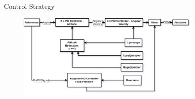 \begin{frame}{Control Strategy}
    \begin{figure}
        \centering
        \includegraphics[width=0.8\textwidth]{img/control.png}
        \label{fig:esquematico}
    \end{figure}

\end{frame}

